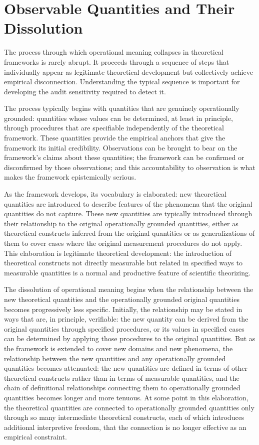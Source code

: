 \documentclass[12pt, openright, twoside]{book}
\begin{document}
\section{Observable Quantities and Their Dissolution}

The process through which operational meaning collapses in
theoretical frameworks is rarely abrupt. It proceeds through
a sequence of steps that individually appear as legitimate
theoretical development but collectively achieve empirical
disconnection. Understanding the typical sequence is important
for developing the audit sensitivity required to detect it.

The process typically begins with quantities that are genuinely
operationally grounded: quantities whose values can be
determined, at least in principle, through procedures that
are specifiable independently of the theoretical framework.
These quantities provide the empirical anchors that give the
framework its initial credibility. Observations can be brought
to bear on the framework's claims about these quantities;
the framework can be confirmed or disconfirmed by those
observations; and this accountability to observation is
what makes the framework epistemically serious.

As the framework develops, its vocabulary is elaborated:
new theoretical quantities are introduced to describe
features of the phenomena that the original quantities
do not capture. These new quantities are typically
introduced through their relationship to the original
operationally grounded quantities, either as theoretical
constructs inferred from the original quantities or as
generalizations of them to cover cases where the original
measurement procedures do not apply. This elaboration is
legitimate theoretical development: the introduction of
theoretical constructs not directly measurable but related
in specified ways to measurable quantities is a normal
and productive feature of scientific theorizing.

The dissolution of operational meaning begins when the
relationship between the new theoretical quantities and
the operationally grounded original quantities becomes
progressively less specific. Initially, the relationship
may be stated in ways that are, in principle, verifiable:
the new quantity can be derived from the original quantities
through specified procedures, or its values in specified
cases can be determined by applying those procedures
to the original quantities. But as the framework is
extended to cover new domains and new phenomena, the
relationship between the new quantities and any operationally
grounded quantities becomes attenuated: the new quantities
are defined in terms of other theoretical constructs
rather than in terms of measurable quantities, and the
chain of definitional relationships connecting them to
operationally grounded quantities becomes longer and
more tenuous. At some point in this elaboration, the
theoretical quantities are connected to operationally
grounded quantities only through so many intermediate
theoretical constructs, each of which introduces additional
interpretive freedom, that the connection is no longer
effective as an empirical constraint.
\end{document}
